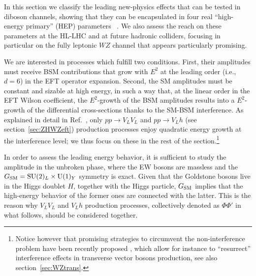 
In this section we classify the leading new-physics effects that can be tested
in diboson channels, showing that they can be encapsulated in four real ``high-energy primary'' (HEP) parameters~\cite{Franceschini:2017ab} .
We also assess the reach on these parameters at the HL-LHC and at future hadronic colliders, focusing in particular
on the fully leptonic $WZ$ channel that appears particularly promising.

We are interested in processes which fulfill two conditions. First, their amplitudes must receive BSM contributions that grow with $E^2$ at the leading order (i.e., $d=6$) in the EFT operator expansion. Second, the  SM amplitudes must be constant and sizable
at high energy, in such a way that, at the linear order in the EFT Wilson coefficient,  the $E^2$-growth of the BSM amplitudes
results into a $E^2$-growth of the differential cross-sections thanks to the SM-BSM interference. 
As explained in detail in Ref.~\cite{Franceschini:2017ab}, only $pp \to V_LV_L $ and $pp \to V_L h$ (see section~\ref{sec:ZHWZeft}) production
processes  enjoy quadratic energy growth at the interference level; we thus focus on these in the rest of the
section.\footnote{Notice however that promising strategies to circumvent the non-interference problem have been recently proposed \cite{Panico:2017frx,Azatov:2017kzw}, which allow for instance to ``resurrect'' interference effects in transverse vector bosons production, see also section~\ref{sec:WZtrans}.}

In order to assess the leading energy behavior, it is sufficient to study the amplitude in the unbroken phase,
where the EW bosons are massless and the $G_{\rm{SM}}={\textrm{SU}}(2)_L\times{\textrm{U}}(1)_Y$ symmetry is exact.
Given that the Goldstone bosons live in the Higgs doublet $H$, together with the Higgs particle, $G_{\rm{SM}}$ implies
that the high-energy behavior of the former ones are connected with the latter. This is the reason why $V_LV_L$
and $V_Lh$ production processes, collectively denoted as $\Phi\Phi'$ in what follows, should be considered together.

